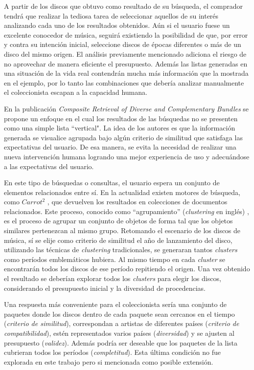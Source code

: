 A partir de los discos que obtuvo como resultado de su búsqueda, el comprador tendrá que realizar la tediosa tarea de seleccionar aquellos de su interés analizando cada uno de los resultados obtenidos. Aún si el usuario fuese un excelente conocedor de música, seguirá existiendo la posibilidad de que, por error y contra su intención inicial, seleccione discos de épocas diferentes o más de un disco del mismo origen. El análisis previamente mencionado adiciona el riesgo de no aprovechar de manera eficiente el presupuesto. Además las listas generadas en una situación de la vida real contendrán mucha más información que la mostrada en el ejemplo, por lo tanto las combinaciones que debería analizar manualmente el coleccionista escapan a la capacidad humana. 

En la publicación {\em Composite Retrieval of Diverse and Complementary Bundles} \cite{journals/tkde/Amer-YahiaBCFMZ14} se propone un enfoque en el cual los resultados de las búsquedas no se presenten como una simple lista ``vertical". La idea de los autores es que la información generada se visualice agrupada bajo algún criterio de similitud que satisfaga las expectativas del usuario. De esa manera, se evita la necesidad de realizar una nueva intervención humana logrando una mejor experiencia de uso y adecuándose a las expectativas del usuario.

En este tipo de búsquedas o consultas, el usuario espera un conjunto de elementos relacionados entre sí. En la actualidad existen motores de búsqueda, como $Carrot^{2}$ \cite{url:carrot}, que devuelven los resultados en colecciones de documentos relacionados. Este proceso, conocido como ``agrupamiento'' (\textit{clustering} en inglés) \cite{wiki:clustering}, es el proceso de agrupar un conjunto de objetos de forma tal que los objetos similares pertenezcan al mismo grupo. Retomando el escenario de los discos de música, sí se elije como criterio de similitud el año de lanzamiento del disco, utilizando las técnicas de {\em clustering} tradicionales, se generaran tantos {\em clusters} como períodos emblemáticos hubiera. Al mismo tiempo en cada {\em cluster} se encontrarán todos los discos de ese período repitiendo el origen. Una vez obtenido el resultado se deberían explorar todos los {\em clusters} para elegir los discos, considerando el presupuesto inicial y la diversidad de procedencias.

Una respuesta más conveniente para el coleccionista sería una conjunto de paquetes donde los discos dentro de cada paquete sean cercanos en el tiempo ({\em criterio de similitud}), correspondan a artistas de diferentes países ({\em criterio de compatibilidad}), estén representados varios países ({\em diversidad}) y se ajusten al presupuesto ({\em validez}). Además podría ser deseable que los paquetes de la lista cubrieran todos los períodos ({\em completitud}). Esta última condición no fue explorada en este trabajo pero si mencionada como posible extensión.

